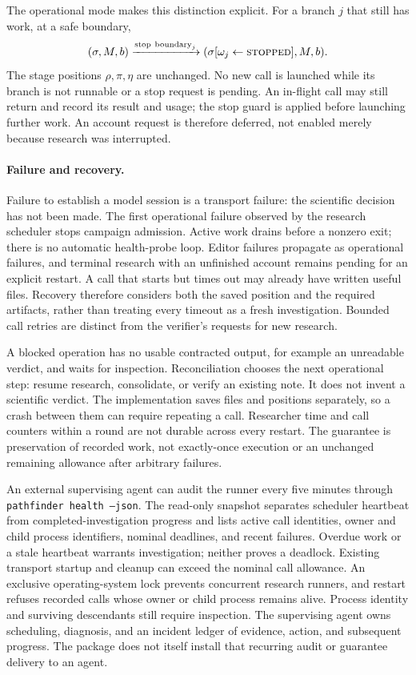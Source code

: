 \documentclass[11pt,a4paper]{article}
\newcommand{\st}[1]{\textsc{#1}}
\begin{document}
The operational mode makes this distinction explicit. For a branch \(j\) that
still has work, at a safe boundary,
\[
 (\sigma,M,b)\xrightarrow{\mathrm{stop\ boundary}_j}
 (\sigma[\omega_j\leftarrow\st{stopped}],M,b).
\]
The stage positions \(\rho,\pi,\eta\) are unchanged. No new call is launched
while its branch is not runnable or a stop request is pending. An in-flight call
may still return and record its result and usage; the stop guard is applied
before launching further work. An account request is therefore deferred, not
enabled merely because research was interrupted.

\paragraph{Failure and recovery.}
Failure to establish a model session is a transport failure: the scientific
decision has not been made. The first operational failure observed by the research
scheduler stops campaign admission. Active work drains before a nonzero exit;
there is no automatic health-probe loop. Editor failures propagate as operational
failures, and terminal research with an unfinished account remains pending for
an explicit restart. A call that starts but times
out may already have written useful files. Recovery therefore considers both the
saved position and the required artifacts, rather than treating every timeout as
a fresh investigation. Bounded call retries are distinct from the verifier's
requests for new research.

A blocked operation has no usable contracted output, for example an unreadable
verdict, and waits for inspection. Reconciliation chooses the next operational
step: resume research, consolidate, or verify an existing note. It does not
invent a scientific verdict. The implementation saves files and positions
separately, so a crash between them can require repeating a call. Researcher
time and call counters within a round are not durable across every restart. The
guarantee is preservation of recorded work, not exactly-once execution or an
unchanged remaining allowance after arbitrary failures.

An external supervising agent can audit the runner every five minutes through
\texttt{pathfinder health --json}. The read-only snapshot separates scheduler
heartbeat from completed-investigation progress and lists active call identities,
owner and child process identifiers, nominal deadlines, and recent failures.
Overdue work or a stale heartbeat warrants investigation; neither proves a
deadlock. Existing transport startup and cleanup can exceed the nominal call
allowance. An exclusive operating-system lock prevents concurrent research
runners, and restart refuses recorded calls whose owner or child process remains
alive. Process identity and surviving descendants still require inspection.
The supervising agent owns scheduling, diagnosis, and an incident ledger of
evidence, action, and subsequent progress. The package does not itself install
that recurring audit or guarantee delivery to an agent.
\end{document}
